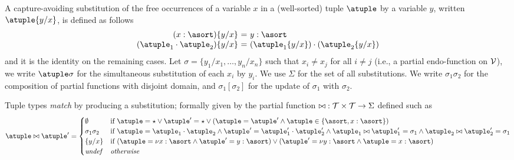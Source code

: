 A capture-avoiding substitution of the free occurrences of a variable
$x$ in a (well-sorted) tuple $\atuple$ by a variable $y$, written
$\atuple \sust x y$, is defined as follows
%
\[
\begin{array}{r@{}l@{\ = \ } ll}
(x  : \asort)
&
\sust x y  
&  
y : \asort
\\
(\atuple_1 \cdot \atuple_2)
&
\sust x y  
& 
(\atuple_1\sust x y) \cdot (\atuple_2\sust x y) 
\end{array}
\]
%
and it is the identity on the remaining cases. Let
$\sigma = \{y_1/x_1,\ldots,y_n/x_n\}$ such that $x_i\neq x_j$ for all
$i\neq j$ (i.e., a partial endo-function on $\mathcal{V}$), we write
$\atuple\sigma$ for the simultaneous substitution of each $x_i$ by
$y_i$.
%
We use $\Sigma$ for the set of all substitutions. We write
$\sigma_1\sigma_2$ for the composition of partial functions with
disjoint domain, and $\sigma_1[\sigma_2]$ for the update of $\sigma_1$
with $\sigma_2$.


Tuple types \emph{match} by producing a substitution; formally given
by the partial function ${\bowtie} : \mathcal{T} \times \mathcal{T}
\rightarrow \Sigma$ defined such as
\[
  \atuple \matches \atuple' \generates
    \begin{cases}
     \emptyset
    & 
    \text{if  } \atuple = \wildcard \vee \atuple' = \wildcard  \vee (\atuple = \atuple' \land \atuple\in\{\asort, x : \asort\})
    \\
    \sigma_1\sigma_2
    &
    \text{if } \atuple = \atuple_1 \cdot \atuple_2
    \land  \atuple' = \atuple'_1 \cdot \atuple'_2
    \land \atuple_1 \matches \atuple'_1 \generates \sigma_1
    \land \atuple_2 \matches \atuple'_2 \generates \sigma_1
    \\
    \sust x y 
    &
    \text{if  } (\atuple = \nu x : \asort \land \atuple' = y: \asort) \vee  (\atuple' = \nu y : \asort \land \atuple = x: \asort) 
    \\
    \textit{undef} & \textit{otherwise}
   \end{cases}
\]

%
%


